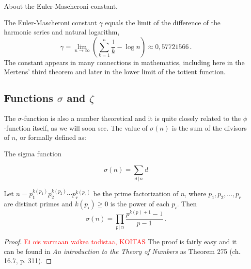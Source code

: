 \documentclass{article}
\begin{document}
\begin{remark}
About the Euler-Mascheroni constant. \emph{\cite{gamma}}

The Euler-Mascheroni constant $\gamma$ equals the limit of the difference of the harmonic series and natural logarithm,
\begin{equation*}
    \gamma=\lim_{n\rightarrow\infty} \left(\sum_{k=1}^n \frac{1}{k} - \log n\right) \approx 0,57721566\,.
\end{equation*}
The constant appears in many connections in mathematics, including here in the Mertens' third theorem and later in the lower limit of the totient function.

\end{remark}

\subsection{Functions $\sigma$ and $\zeta$}

The $\sigma$-function is also a number theoretical and it is quite closely related to the $\phi$-function itself, as we will soon see. The value of $\sigma(n)$ is the sum of the divisors of $n$, or formally defined as:

\begin{definition}
The sigma function

\begin{equation*}
    \sigma(n)=\sum_{d\,\vert\, n} d
\end{equation*}
\end{definition}

\begin{lemma}
\label{lemma:sigma}
Let $n=p_1^{k(p_1)}p_2^{k(p_2)}\cdots p_r^{k(p_r)}$ be the prime factorization of $n$, where $p_1,p_2,\dots,p_r$ are distinct primes and $k(p_i)\geq0$ is the power of each $p_i$. Then
\begin{equation*}
    \sigma(n) = \prod_{p\,\vert\, n} \frac{p^{k(p)+1}-1}{p-1}\,.
\end{equation*}

\begin{proof}
\textcolor{red}{Ei ois varmaan vaikea todistaa, KOITAS} The proof is fairly easy and it can be found in \textit{An introduction to the Theory of Numbers} \cite{HardyWright} as Theorem 275 (ch. 16.7, p. 311).
\end{proof}
\end{lemma}
\end{document}
